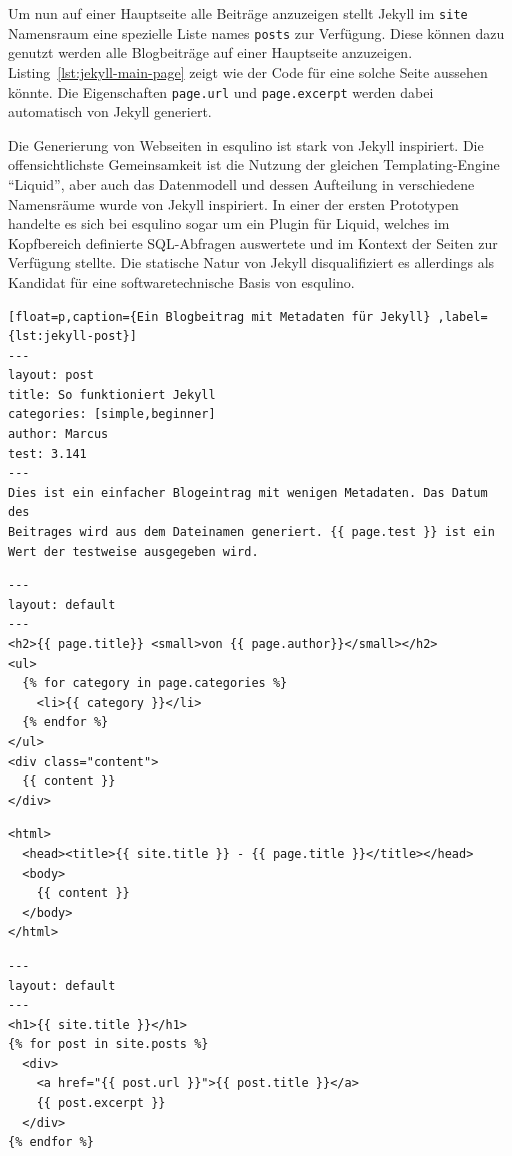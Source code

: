 Um nun auf einer Hauptseite alle Beiträge anzuzeigen stellt Jekyll im \lstinline{site} Namensraum eine spezielle Liste names \lstinline{posts} zur Verfügung. Diese können dazu genutzt werden alle Blogbeiträge auf einer Hauptseite anzuzeigen. Listing~\ref{lst:jekyll-main-page} zeigt wie der Code für eine solche Seite aussehen könnte. Die Eigenschaften \lstinline|page.url| und \lstinline|page.excerpt| werden dabei automatisch von Jekyll generiert.

Die Generierung von Webseiten in esqulino ist stark von Jekyll inspiriert. Die offensichtlichste Gemeinsamkeit ist die Nutzung der gleichen Templating-Engine "`Liquid"', aber auch das Datenmodell und dessen Aufteilung in verschiedene Namensräume wurde von Jekyll inspiriert. In einer der ersten Prototypen handelte es sich bei esqulino sogar um ein Plugin für Liquid, welches im Kopfbereich definierte SQL-Abfragen auswertete und im Kontext der Seiten zur Verfügung stellte. Die statische Natur von Jekyll disqualifiziert es allerdings als Kandidat für eine softwaretechnische Basis von esqulino.

\begin{lstlisting}[float=p,caption={Ein Blogbeitrag mit Metadaten für Jekyll} ,label={lst:jekyll-post}]
---
layout: post
title: So funktioniert Jekyll
categories: [simple,beginner]
author: Marcus
test: 3.141
---
Dies ist ein einfacher Blogeintrag mit wenigen Metadaten. Das Datum des
Beitrages wird aus dem Dateinamen generiert. {{ page.test }} ist ein
Wert der testweise ausgegeben wird.
\end{lstlisting}

\begin{lstlisting}[float=p,caption={Beispieltemplate für Blogbeiträge für Jekyll}, label={lst:jekyll-post-template}]
---
layout: default
---
<h2>{{ page.title}} <small>von {{ page.author}}</small></h2>
<ul>
  {% for category in page.categories %}
    <li>{{ category }}</li>
  {% endfor %}
</ul>
<div class="content">
  {{ content }}
</div>
\end{lstlisting}

\begin{lstlisting}[float=p,caption={Template mit HTML-Rumpf für Jekyll}, label={lst:jekyll-master-template}]
<html>
  <head><title>{{ site.title }} - {{ page.title }}</title></head>
  <body>
    {{ content }}
  </body>
</html>
\end{lstlisting}

\begin{lstlisting}[float=p,caption={Hauptseite mit Auszügen alle Beiträge für Jekyll}, label={lst:jekyll-main-page}]
---
layout: default
---
<h1>{{ site.title }}</h1>
{% for post in site.posts %}
  <div>
    <a href="{{ post.url }}">{{ post.title }}</a>
    {{ post.excerpt }}
  </div>
{% endfor %}
\end{lstlisting}

